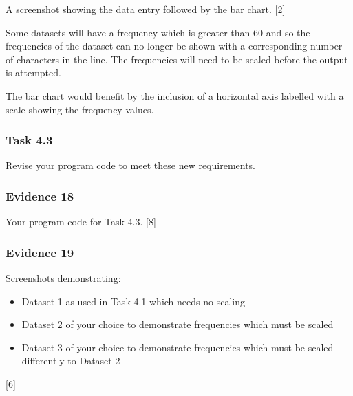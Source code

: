 A screenshot showing the data entry followed by the bar chart. \hfill{}{[}2{]}

Some datasets will have a frequency which is greater than 60 and so
the frequencies of the dataset can no longer be shown with a corresponding
number of characters in the line. The frequencies will need to be
scaled before the output is attempted.

The bar chart would benefit by the inclusion of a horizontal axis
labelled with a scale showing the frequency values.

\subsubsection*{Task 4.3}

Revise your program code to meet these new requirements.

\subsubsection*{Evidence 18}

Your program code for Task 4.3.\hfill{} {[}8{]}

\subsubsection*{Evidence 19}

Screenshots demonstrating: 
\begin{itemize}
\item Dataset 1 as used in Task 4.1 which needs no scaling 
\item Dataset 2 of your choice to demonstrate frequencies which must be
scaled 
\item Dataset 3 of your choice to demonstrate frequencies which must be
scaled differently to Dataset 2 
\end{itemize}
\hfill{}{[}6{]}